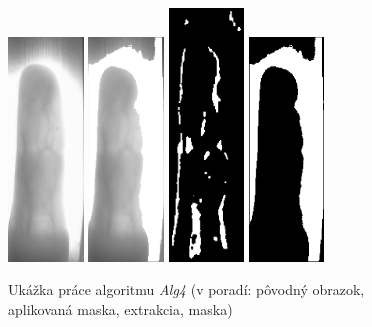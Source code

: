 \documentclass[11pt,a4paper]{article}
\begin{document}
\begin{figure}[ht!]
	\centering
	\includegraphics[width=2cm]{fig/F_08_puvodni.eps}
	\includegraphics[width=2cm]{fig/F_08_aplikovana_maska.eps}
	\includegraphics[width=2cm]{fig/F_08_extrakce.eps}
	\includegraphics[width=2cm]{fig/F_08_maska.eps}
	\caption{\label{fig:alg4} Ukážka práce algoritmu \emph{Alg4} (v poradí:
	pôvodný obrazok, aplikovaná maska, extrakcia, maska)}
\end{figure}
\end{document}
